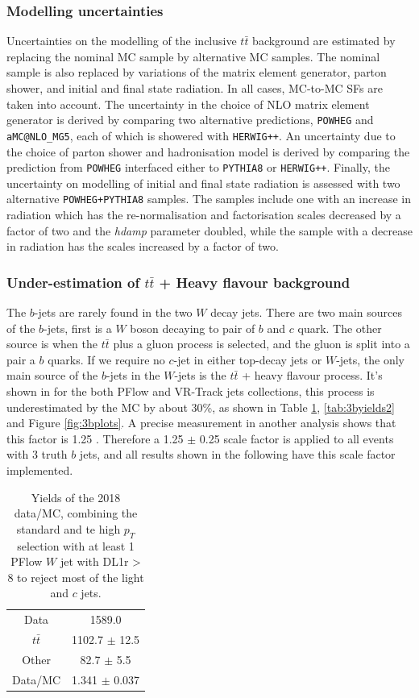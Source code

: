 \documentclass[letterpaper,12pt]{article}
\begin{document}
\subsubsection{Modelling uncertainties} Uncertainties on the modelling of the inclusive $t\bar{t}$ 
background are estimated by replacing the nominal MC sample by alternative MC samples. The nominal 
sample is also replaced by variations of the matrix element generator, parton shower, and initial 
and final state radiation. In all cases, MC-to-MC SFs are taken into account. The uncertainty in 
the choice of NLO matrix element generator is derived by comparing two alternative predictions, 
{\tt POWHEG} and {\tt aMC@NLO\_MG5}, each of which is showered with {\tt HERWIG++}. An uncertainty 
due to the choice of parton shower and hadronisation model is derived by comparing the prediction 
from {\tt POWHEG} interfaced either to {\tt PYTHIA8} or {\tt HERWIG++}. Finally, the uncertainty on 
modelling of initial and final state radiation is assessed with two alternative {\tt POWHEG+PYTHIA8} 
samples. The samples include one with an increase in radiation which has the re-normalisation and 
factorisation scales decreased by a factor of two and the \textit{hdamp} parameter doubled, while 
the sample with a decrease in radiation has the scales increased by a factor of two.

\subsubsection{Under-estimation of $t\bar{t}$ + Heavy flavour background }
The $b$-jets are rarely found in the two $W$ decay jets. There are two main sources of 
the $b$-jets, first is a $W$ boson decaying to pair of $b$ and $c$ quark. The other 
source is when the $t\bar{t}$ plus a gluon process is selected, and the gluon is split 
into a pair a $b$ quarks. If we require no $c$-jet in either top-decay jets or $W$-jets, 
the only main source of the $b$-jets in the $W$-jets is the $t\bar{t}$ + heavy flavour 
process. It's shown in for the both PFlow and VR-Track jets collections, this process is 
underestimated by the MC by about 30\%, as shown in Table \ref{tab:3byields1}, 
\ref{tab:3byields2} and Figure \ref{fig:3bplots}. A precise measurement in another 
analysis shows that this factor is 1.25 \cite{ttbar+HF SF}. Therefore a 1.25 $\pm$ 0.25 
scale factor is applied to all events with 3 truth $b$ jets, and all results shown in the 
following have this scale factor implemented. 
\begin{table}[]
    \centering
    \begin{tabular}{c|c}
        Data & 1589.0 \\
         $t\bar{t}$ & 1102.7 $\pm$ 12.5 \\
         Other & 82.7 $\pm$ 5.5 \\
         Data/MC & 1.341 $\pm$ 0.037 \\
    \end{tabular}
    \caption{Yields of the 2018 data/MC, combining the standard and te high $p_T$ selection with at least 1 PFlow $W$ jet with DL1r > 8 to reject most of the light and $c$ jets.}
    \label{tab:3byields1}
\end{table}
\end{document}

